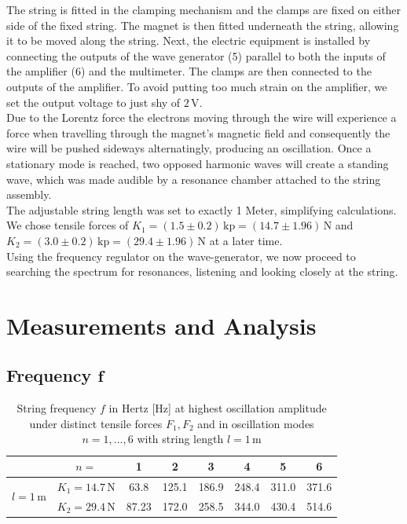 \documentclass{scrreprt}
\newcommand{\unit}[1]{\ensuremath{\, \mathrm{#1}}}
\begin{document}
The string is fitted in the clamping mechanism and the clamps are fixed on either side of the fixed string. The magnet is then fitted underneath the string, allowing it to be moved along the string. Next, the electric equipment is installed by connecting the outputs of the wave generator (5) parallel to both the inputs of the amplifier (6) and the multimeter. The clamps are then connected to the outputs of the amplifier.
To avoid putting too much strain on the amplifier, we set the output voltage to just shy of $2\unit{V}$.\\
Due to the Lorentz force the electrons moving through the wire will experience a force when travelling through the magnet's magnetic field and consequently the wire will be pushed sideways alternatingly, producing an oscillation. Once a stationary mode is reached, two opposed harmonic waves will create a standing wave, which was made audible by a resonance chamber attached to the string assembly.\\
The adjustable string length was set to exactly 1 Meter, simplifying calculations. We chose tensile forces of $K_1=(1.5 \pm 0.2) \unit{kp} =(14.7 \pm 1.96)\unit{N}$ and $K_2=(3.0 \pm 0.2) \unit{kp} =(29.4 \pm 1.96) \unit{N}$ at a later time.\\
Using the frequency regulator on the wave-generator, we now proceed to searching the spectrum for resonances, listening and looking closely at the string.

\section{Measurements and Analysis}

\subsection[Frequency]{Frequency $\bm{f}$}

\begin{table}[H]
	\center
	\begin{tabular}{|c|c|cccccc|}
	\cline{2-8}
	 \multicolumn{1}{c|}{}& $n=$ & 1 & 2 & 3 & 4 & 5 & 6\\  \hline
	\multirow{2}{*}{$l=1\unit{m}$} & $K_1=14.7\unit{N}$ & 63.8 & 125.1 & 186.9 & 248.4 & 311.0 & 371.6\\
	& $K_2=29.4\unit{N}$ & 87.23 & 172.0 & 258.5 & 344.0 & 430.4 & 514.6\\
	\hline
	\end{tabular}
	\caption{String frequency $f$ in Hertz [Hz] at highest oscillation amplitude under distinct tensile forces $F_1, F_2$ and in oscillation modes $n=1,...,6$ with string length $l=1\unit{m}$}
\end{table}
\end{document}
